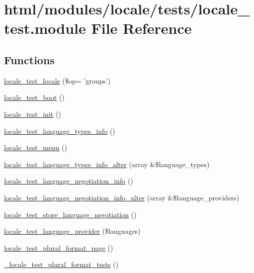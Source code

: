 \hypertarget{locale__test_8module}{
\section{html/modules/locale/tests/locale\_\-test.module File Reference}
\label{locale__test_8module}
}
\subsection*{Functions}
\begin{DoxyCompactItemize}
\item 
\hyperlink{locale__test_8module_a45396bc87d59d545353c1acb14dbb572}{locale\_\-test\_\-locale} (\$op= 'groups')
\item 
\hyperlink{locale__test_8module_a4b5cc29009b03154bef82702514343f8}{locale\_\-test\_\-boot} ()
\item 
\hyperlink{locale__test_8module_a0c7f19a698f46c68061bc35ee695fc15}{locale\_\-test\_\-init} ()
\item 
\hyperlink{locale__test_8module_a3bad268dee9392f2aa9a77a98f074ba6}{locale\_\-test\_\-language\_\-types\_\-info} ()
\item 
\hyperlink{locale__test_8module_a977b4e50e931e25a7d2c263e97192177}{locale\_\-test\_\-menu} ()
\item 
\hyperlink{locale__test_8module_af9eb4bf83cc7414e4bd35c380328ca55}{locale\_\-test\_\-language\_\-types\_\-info\_\-alter} (array \&\$language\_\-types)
\item 
\hyperlink{locale__test_8module_a1f997fc5113895acdbfae86ae1663d0f}{locale\_\-test\_\-language\_\-negotiation\_\-info} ()
\item 
\hyperlink{locale__test_8module_af4f45f558d8b91ec470a7bfe61603616}{locale\_\-test\_\-language\_\-negotiation\_\-info\_\-alter} (array \&\$language\_\-providers)
\item 
\hyperlink{locale__test_8module_ab9c352db2ddd976f5fc2d46bf640d4b8}{locale\_\-test\_\-store\_\-language\_\-negotiation} ()
\item 
\hyperlink{locale__test_8module_abffb4b9384b6cc1f12d88b25c531cd46}{locale\_\-test\_\-language\_\-provider} (\$languages)
\item 
\hyperlink{locale__test_8module_ad8530e02353ed84ac27f4fb5ec73deab}{locale\_\-test\_\-plural\_\-format\_\-page} ()
\item 
\hyperlink{locale__test_8module_a42dcbf9a5e8e2f16e2aa0c908b2b5130}{\_\-locale\_\-test\_\-plural\_\-format\_\-tests} ()
\end{DoxyCompactItemize}


